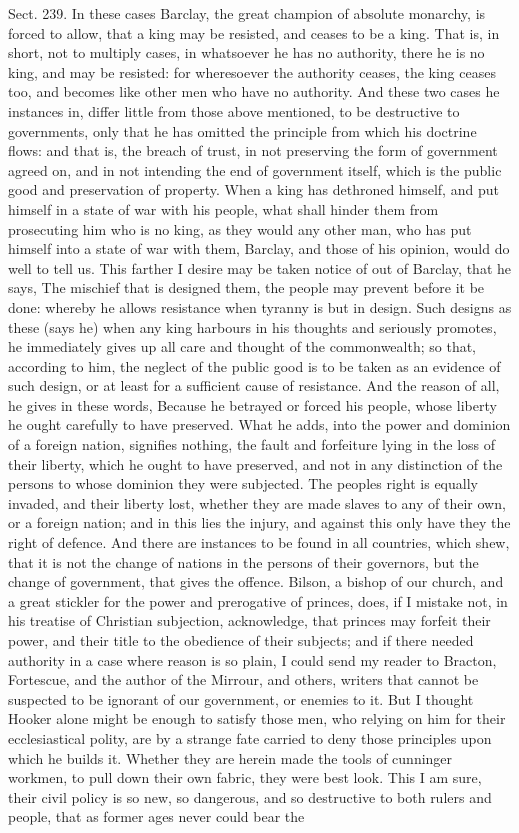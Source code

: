 \documentclass[11pt,openany]{book}
\begin{document}
Sect. 239. In these cases Barclay, the great champion of absolute monarchy, is forced to allow, that a king may be resisted, and ceases to be a king. That is, in short, not to multiply cases, in whatsoever he has no authority, there he is no king, and may be resisted: for wheresoever the authority ceases, the king ceases too, and becomes like other men who have no authority. And these two cases he instances in, differ little from those above mentioned, to be destructive to governments, only that he has omitted the principle from which his doctrine flows: and that is, the breach of trust, in not preserving the form of government agreed on, and in not intending the end of government itself, which is the public good and preservation of property. When a king has dethroned himself, and put himself in a state of war with his people, what shall hinder them from prosecuting him who is no king, as they would any other man, who has put himself into a state of war with them, Barclay, and those of his opinion, would do well to tell us. This farther I desire may be taken notice of out of Barclay, that he says, The mischief that is designed them, the people may prevent before it be done: whereby he allows resistance when tyranny is but in design. Such designs as these (says he) when any king harbours in his thoughts and seriously promotes, he immediately gives up all care and thought of the commonwealth; so that, according to him, the neglect of the public good is to be taken as an evidence of such design, or at least for a sufficient cause of resistance. And the reason of all, he gives in these words, Because he betrayed or forced his people, whose liberty he ought carefully to have preserved. What he adds, into the power and dominion of a foreign nation, signifies nothing, the fault and forfeiture lying in the loss of their liberty, which he ought to have preserved, and not in any distinction of the persons to whose dominion they were subjected. The peoples right is equally invaded, and their liberty lost, whether they are made slaves to any of their own, or a foreign nation; and in this lies the injury, and against this only have they the right of defence. And there are instances to be found in all countries, which shew, that it is not the change of nations in the persons of their governors, but the change of government, that gives the offence. Bilson, a bishop of our church, and a great stickler for the power and prerogative of princes, does, if I mistake not, in his treatise of Christian subjection, acknowledge, that princes may forfeit their power, and their title to the obedience of their subjects; and if there needed authority in a case where reason is so plain, I could send my reader to Bracton, Fortescue, and the author of the Mirrour, and others, writers that cannot be suspected to be ignorant of our government, or enemies to it. But I thought Hooker alone might be enough to satisfy those men, who relying on him for their ecclesiastical polity, are by a strange fate carried to deny those principles upon which he builds it. Whether they are herein made the tools of cunninger workmen, to pull down their own fabric, they were best look. This I am sure, their civil policy is so new, so dangerous, and so destructive to both rulers and people, that as former ages never could bear the 
\end{document}
